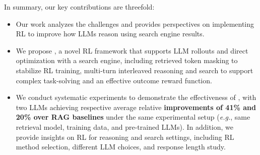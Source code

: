 In summary, our key contributions are threefold:
\begin{itemize}[leftmargin=*]
    \item Our work analyzes the challenges and provides perspectives on implementing RL to improve how LLMs reason using search engine results.
    \item We propose \Ours, a novel RL framework that supports LLM rollouts and direct optimization with a search engine, including retrieved token masking to stabilize RL training, multi-turn interleaved reasoning and search to support complex task-solving and an effective outcome reward function.
    \item We conduct systematic experiments to demonstrate the effectiveness of \Ours, with two LLMs achieving respective average relative \textbf{improvements of 41\% and 20\% over RAG baselines} under the same experimental setup (\textit{e.g.}, same retrieval model, training data, and pre-trained LLMs). In addition, we provide insights on RL for reasoning and search settings, including RL method selection, different LLM choices, and response length study.
\end{itemize}

